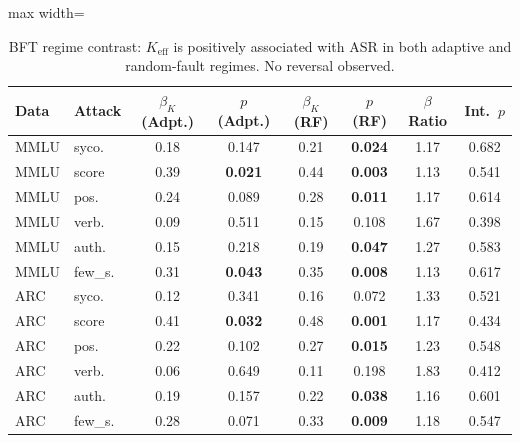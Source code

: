 \documentclass[11pt,a4paper]{article}
\begin{document}
\begin{table}[t]
\centering
\caption{BFT regime contrast: $K_{\mathrm{eff}}$ is positively associated with ASR in both adaptive and random-fault regimes. No reversal observed.}
\label{tab:bft}
\small
\begin{adjustbox}{max width=\textwidth}
\begin{tabular}{llcccccc}
\toprule
\textbf{Data} & \textbf{Attack} & $\beta_K$ \textbf{(Adpt.)} & $p$ \textbf{(Adpt.)} & $\beta_K$ \textbf{(RF)} & $p$ \textbf{(RF)} & \textbf{$\beta$ Ratio} & \textbf{Int.\ $p$} \\
\midrule
MMLU & syco. & 0.18 & 0.147 & 0.21 & \textbf{0.024} & 1.17 & 0.682 \\
MMLU & score & 0.39 & \textbf{0.021} & 0.44 & \textbf{0.003} & 1.13 & 0.541 \\
MMLU & pos. & 0.24 & 0.089 & 0.28 & \textbf{0.011} & 1.17 & 0.614 \\
MMLU & verb. & 0.09 & 0.511 & 0.15 & 0.108 & 1.67 & 0.398 \\
MMLU & auth. & 0.15 & 0.218 & 0.19 & \textbf{0.047} & 1.27 & 0.583 \\
MMLU & few\_s. & 0.31 & \textbf{0.043} & 0.35 & \textbf{0.008} & 1.13 & 0.617 \\
ARC & syco. & 0.12 & 0.341 & 0.16 & 0.072 & 1.33 & 0.521 \\
ARC & score & 0.41 & \textbf{0.032} & 0.48 & \textbf{0.001} & 1.17 & 0.434 \\
ARC & pos. & 0.22 & 0.102 & 0.27 & \textbf{0.015} & 1.23 & 0.548 \\
ARC & verb. & 0.06 & 0.649 & 0.11 & 0.198 & 1.83 & 0.412 \\
ARC & auth. & 0.19 & 0.157 & 0.22 & \textbf{0.038} & 1.16 & 0.601 \\
ARC & few\_s. & 0.28 & 0.071 & 0.33 & \textbf{0.009} & 1.18 & 0.547 \\
\bottomrule
\end{tabular}
\end{adjustbox}
\end{table}
\end{document}
